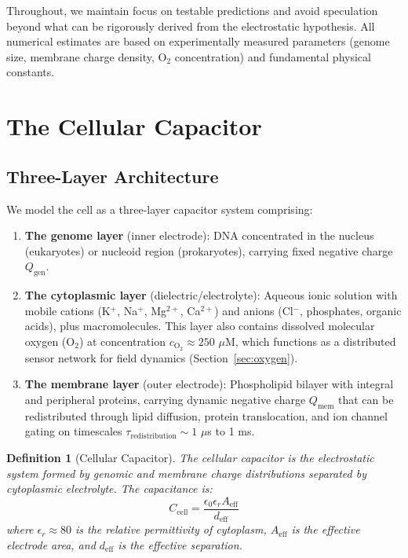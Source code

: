 \documentclass[twocolumn,10pt,aps,prd,superscriptaddress,floatfix,nofootinbib]{revtex4-2}
\newtheorem{definition}[theorem]{Definition}
\theoremstyle{remark}
\begin{document}
Throughout, we maintain focus on testable predictions and avoid speculation beyond what can be rigorously derived from the electrostatic hypothesis. All numerical estimates are based on experimentally measured parameters (genome size, membrane charge density, O$_2$ concentration) and fundamental physical constants.

\section{The Cellular Capacitor}
\label{sec:capacitor}

\subsection{Three-Layer Architecture}

We model the cell as a three-layer capacitor system comprising:

\begin{enumerate}
\item \textbf{The genome layer} (inner electrode): DNA concentrated in the nucleus (eukaryotes) or nucleoid region (prokaryotes), carrying fixed negative charge $Q_{\mathrm{gen}}$.

\item \textbf{The cytoplasmic layer} (dielectric/electrolyte): Aqueous ionic solution with mobile cations (K$^+$, Na$^+$, Mg$^{2+}$, Ca$^{2+}$) and anions (Cl$^-$, phosphates, organic acids), plus macromolecules. This layer also contains dissolved molecular oxygen (O$_2$) at concentration $c_{\mathrm{O_2}} \approx 250$ $\mu$M, which functions as a distributed sensor network for field dynamics (Section~\ref{sec:oxygen}).

\item \textbf{The membrane layer} (outer electrode): Phospholipid bilayer with integral and peripheral proteins, carrying dynamic negative charge $Q_{\mathrm{mem}}$ that can be redistributed through lipid diffusion, protein translocation, and ion channel gating on timescales $\tau_{\mathrm{redistribution}} \sim 1$ $\mu$s to 1 ms.
\end{enumerate}

\begin{definition}[Cellular Capacitor]
\label{def:cell_capacitor}
The cellular capacitor is the electrostatic system formed by genomic and membrane charge distributions separated by cytoplasmic electrolyte. The capacitance is:
\begin{equation}
C_{\mathrm{cell}} = \frac{\epsilon_0 \epsilon_r A_{\mathrm{eff}}}{d_{\mathrm{eff}}}
\label{eq:cell_capacitance}
\end{equation}
where $\epsilon_r \approx 80$ is the relative permittivity of cytoplasm, $A_{\mathrm{eff}}$ is the effective electrode area, and $d_{\mathrm{eff}}$ is the effective separation.
\end{definition}
\end{document}
